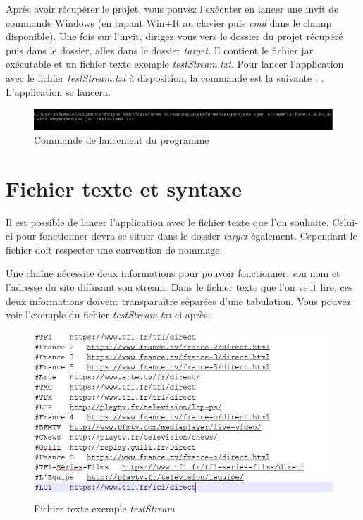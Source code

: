 \documentclass{polytech/polytech}
\begin{document}
Après avoir récupérer le projet, vous pouvez l'exécuter en lancer une invit de commande Windows (en tapant Win+R au clavier puis \textit{cmd} dans le champ disponible). Une fois sur l'invit, dirigez vous vers le dossier du projet récupéré puis dans le dossier, allez dans le dossier \textit{target}. Il contient le fichier jar exécutable et un fichier texte exemple \textit{testStream.txt}. Pour lancer l'application avec le fichier \textit{testStream.txt} à disposition, la commande est la suivante : . L'application se lancera.

\begin{figure}
	\includegraphics[scale=0.6]{images/cmdLancement.png}
	\caption{Commande de lancement du programme}
\end{figure}


\section{Fichier texte et syntaxe}

Il est possible de lancer l'application avec le fichier texte que l'on souhaite. Celui-ci pour fonctionner devra se situer dans le dossier \textit{target} également. Cependant le fichier doit respecter une convention de nommage. 


Une chaîne nécessite deux informations pour pouvoir fonctionner: son nom et l'adresse du site diffusant son stream. Dans le fichier texte que l'on veut lire, ces deux informations doivent transparaître séparées d'une tabulation. Vous pouvez voir l'exemple du fichier \textit{testStream.txt} ci-après:

\begin{figure}
	\includegraphics[scale=0.7]{images/testStream.png}
	\caption{Fichier texte exemple \textit{testStream}}
	\label{fig:fichier_texte}
\end{figure}
\end{document}
